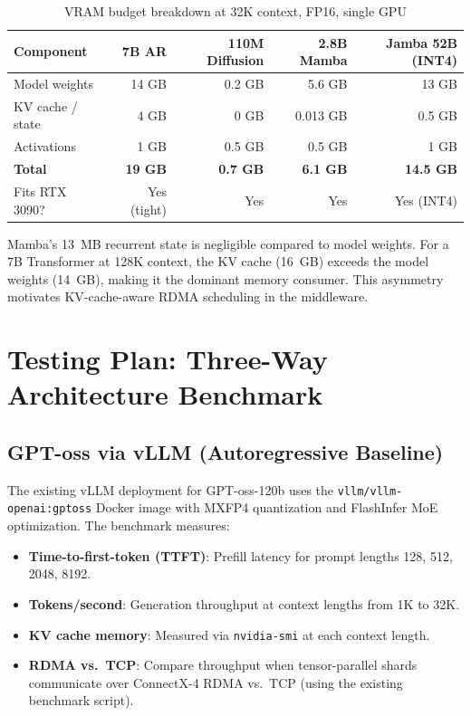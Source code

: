 \documentclass[11pt,letterpaper]{article}
\begin{document}
\begin{table}[htbp]
\centering
\caption{VRAM budget breakdown at 32K context, FP16, single GPU}
\label{tab:vram}
\begin{tabular}{@{}lrrrr@{}}
\toprule
\textbf{Component} & \textbf{7B AR} & \textbf{110M Diffusion} & \textbf{2.8B Mamba} & \textbf{Jamba 52B (INT4)} \\
\midrule
Model weights & 14 GB & 0.2 GB & 5.6 GB & 13 GB \\
KV cache / state & 4 GB & 0 GB & 0.013 GB & 0.5 GB \\
Activations & 1 GB & 0.5 GB & 0.5 GB & 1 GB \\
\midrule
\textbf{Total} & \textbf{19 GB} & \textbf{0.7 GB} & \textbf{6.1 GB} & \textbf{14.5 GB} \\
Fits RTX 3090? & Yes (tight) & Yes & Yes & Yes (INT4) \\
\bottomrule
\end{tabular}
\end{table}

Mamba's 13~MB recurrent state is negligible compared to model weights. For a 7B Transformer at 128K context, the KV cache (16~GB) exceeds the model weights (14~GB), making it the dominant memory consumer. This asymmetry motivates KV-cache-aware RDMA scheduling in the middleware.

\section{Testing Plan: Three-Way Architecture Benchmark}
\label{sec:testing}

\subsection{GPT-oss via vLLM (Autoregressive Baseline)}

The existing vLLM deployment for GPT-oss-120b uses the \texttt{vllm/vllm-openai:gptoss} Docker image with MXFP4 quantization and FlashInfer MoE optimization. The benchmark measures:

\begin{itemize}[noitemsep]
    \item \textbf{Time-to-first-token (TTFT)}: Prefill latency for prompt lengths 128, 512, 2048, 8192.
    \item \textbf{Tokens/second}: Generation throughput at context lengths from 1K to 32K.
    \item \textbf{KV cache memory}: Measured via \texttt{nvidia-smi} at each context length.
    \item \textbf{RDMA vs.\ TCP}: Compare throughput when tensor-parallel shards communicate over ConnectX-4 RDMA vs.\ TCP (using the existing benchmark script).
\end{itemize}
\end{document}
